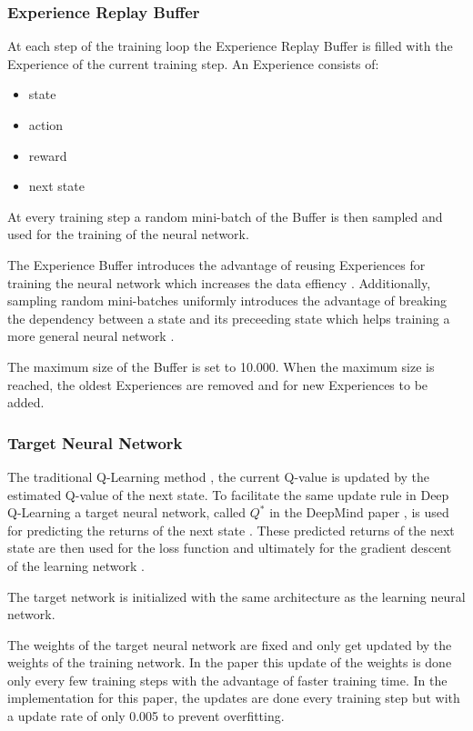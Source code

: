 \documentclass[conference]{IEEEtran}
\begin{document}
\subsubsection{Experience Replay Buffer} \label{replay-buffer}
At each step of the training loop the Experience Replay Buffer is filled with the Experience of the current training step. 
An Experience consists of:
\begin{itemize}
	\item state
	\item action
	\item reward
	\item next state
\end{itemize}
At every training step a random mini-batch of the Buffer is then sampled and used for the training of the neural network.

The Experience Buffer introduces the advantage of reusing Experiences for training the neural network which increases the data effiency \cite{b2}.
Additionally, sampling random mini-batches uniformly introduces the advantage of breaking the dependency between a state and its preceeding state which helps training a more general neural network \cite{b2}. 

The maximum size of the Buffer is set to 10.000.
When the maximum size is reached, the oldest Experiences are removed and for new Experiences to be added. 

\subsubsection{Target Neural Network}
The traditional Q-Learning method \cite{b4}, the current Q-value is updated by the estimated Q-value of the next state.
To facilitate the same update rule in Deep Q-Learning a target neural network, called $Q^*$ in the DeepMind paper \cite{b2}, is used for predicting the returns of the next state \cite{b6}.
These predicted returns of the next state are then used for the loss function and ultimately for the gradient descent of the learning network \cite{b6}. 

The target network is initialized with the same architecture as the learning neural network.

The weights of the target neural network are fixed and only get updated by the weights of the training network. 
In the paper \cite{b6} this update of the weights is done only every few training steps with the advantage of faster training time. 
In the implementation for this paper, the updates are done every training step but with a update rate of only 0.005 to prevent overfitting.
\end{document}
